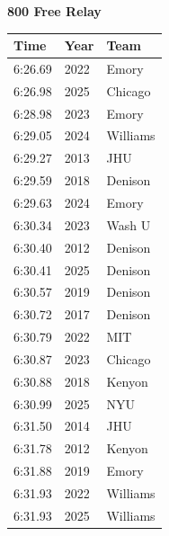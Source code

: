 \noindent\begin{minipage}[t]{0.98\textwidth}
\centering
\textbf{\textcolor{teamprimary}{800 Free Relay}}\par
\vspace{0.5em}
\centering
\small
\renewcommand{\arraystretch}{1.0}
\setlength{\tabcolsep}{4pt}
\begin{tabular}{@{}p{4.5cm}p{2.5cm}p{4.5cm}@{}}
\toprule
\textbf{Time} & \textbf{Year} & \textbf{Team} \\
\midrule
6:26.69 & 2022 & Emory \\
6:26.98 & 2025 & Chicago \\
6:28.98 & 2023 & Emory \\
6:29.05 & 2024 & Williams \\
6:29.27 & 2013 & JHU \\
6:29.59 & 2018 & Denison \\
6:29.63 & 2024 & Emory \\
6:30.34 & 2023 & Wash U \\
6:30.40 & 2012 & Denison \\
6:30.41 & 2025 & Denison \\
6:30.57 & 2019 & Denison \\
6:30.72 & 2017 & Denison \\
6:30.79 & 2022 & MIT \\
6:30.87 & 2023 & Chicago \\
6:30.88 & 2018 & Kenyon \\
6:30.99 & 2025 & NYU \\
6:31.50 & 2014 & JHU \\
6:31.78 & 2012 & Kenyon \\
6:31.88 & 2019 & Emory \\
6:31.93 & 2022 & Williams \\
6:31.93 & 2025 & Williams \\
\bottomrule
\end{tabular}
\end{minipage}
\vspace{1.2em}
